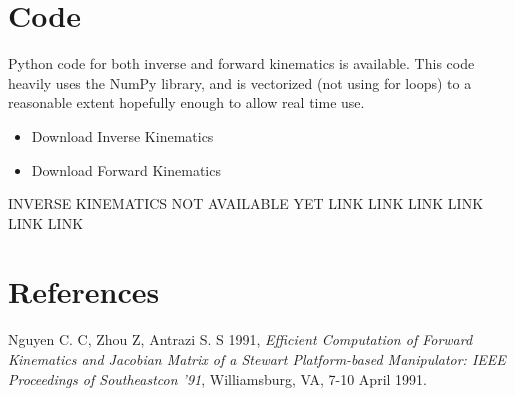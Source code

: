 \documentclass[]{article}
\begin{document}
	\section{Code}
	\par
		Python code for both inverse and forward kinematics is available. This code heavily uses the NumPy library, and is vectorized (not using for loops) to a reasonable extent \textemdash hopefully enough to allow real time use.
		\begin{itemize}
			\item Download Inverse Kinematics
			\item Download Forward Kinematics
		\end{itemize}
		INVERSE KINEMATICS NOT AVAILABLE YET
		LINK LINK LINK LINK LINK LINK
		
	\section{References}
	\par
		Nguyen C. C, Zhou Z, Antrazi S. S 1991, \emph{Efficient Computation of Forward Kinematics and Jacobian Matrix of a Stewart Platform-based Manipulator: IEEE Proceedings of Southeastcon '91}, Williamsburg, VA, 7-10 April 1991. 
\end{document}

